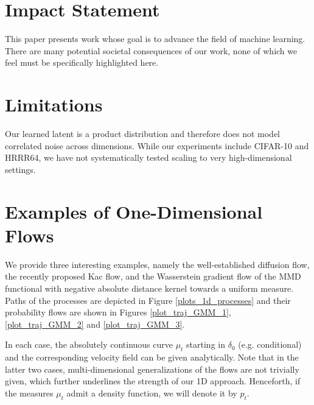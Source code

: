 \documentclass{article}
\theoremstyle{plain}
\theoremstyle{definition}
\theoremstyle{remark}
\begin{document}
\section*{Impact Statement}
This paper presents work whose goal is to advance the field of machine learning. There are many potential societal consequences of our work, none of which we feel must be specifically highlighted here.

\section*{Limitations}
Our learned latent is a product distribution and therefore does not model
correlated noise across dimensions. While our experiments include CIFAR-10 and
HRRR64, we have not systematically tested scaling to very high-dimensional
settings.





\newpage
\appendix
\onecolumn




\section{Examples of One-Dimensional Flows}\label{sec:ingredients1D}
We provide three interesting examples, namely the well-established diffusion flow,
the recently proposed Kac flow, and the Wasserstein gradient flow of the MMD functional with negative absolute distance kernel towards a uniform measure. Paths of the processes are depicted in Figure \ref{plots_1d_processes} { and their probability flows are shown in Figures \ref{plot_traj_GMM_1}, \ref{plot_traj_GMM_2} and \ref{plot_traj_GMM_3}}.

In each case, the absolutely continuous curve $\mu_t$ starting in $\delta_0$ (e.g. conditional) and the corresponding velocity field can be given analytically. 
Note that in the latter two cases, multi-dimensional generalizations of the flows are not trivially given, which further underlines the strength of our 1D approach.
Henceforth, if the measures $\mu_t$ admit a density function, we will denote it by $p_t$.
\end{document}
